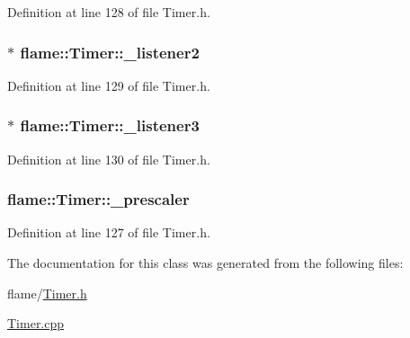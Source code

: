 Definition at line 128 of file Timer.\-h.

\hypertarget{classflame_1_1_timer_a3bf0ea6030b447a0a56b3e71809914cc}{
\subsubsection[{\-\_\-listener2}]{$\ast$ flame\-::\-Timer\-::\-\_\-listener2\hspace{0.3cm}{\ttfamily [protected]}}}\label{classflame_1_1_timer_a3bf0ea6030b447a0a56b3e71809914cc}


Definition at line 129 of file Timer.\-h.

\hypertarget{classflame_1_1_timer_a7bee9ed9b97f3c13037e28e8b87dfa88}{
\subsubsection[{\-\_\-listener3}]{$\ast$ flame\-::\-Timer\-::\-\_\-listener3\hspace{0.3cm}{\ttfamily [protected]}}}\label{classflame_1_1_timer_a7bee9ed9b97f3c13037e28e8b87dfa88}


Definition at line 130 of file Timer.\-h.

\hypertarget{classflame_1_1_timer_a42ef3eb87072be64291e7eff82c1d0c2}{
\subsubsection[{\-\_\-prescaler}]{ flame\-::\-Timer\-::\-\_\-prescaler\hspace{0.3cm}{\ttfamily [protected]}}}\label{classflame_1_1_timer_a42ef3eb87072be64291e7eff82c1d0c2}


Definition at line 127 of file Timer.\-h.



The documentation for this class was generated from the following files\-:\begin{DoxyCompactItemize}
\item 
flame/\hyperlink{_timer_8h}{Timer.\-h}\item 
\hyperlink{_timer_8cpp}{Timer.\-cpp}\end{DoxyCompactItemize}
